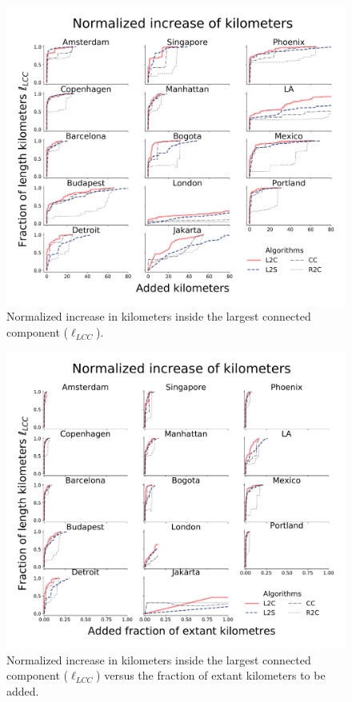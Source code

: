 \begin{figure}[h!]
  \centering
  \includegraphics[width=\textwidth]{images/datadriven/SI_Lengths.png}
  \caption{Normalized increase in kilometers inside the largest connected component ($\ell_{LCC}$).}
  \label{fig:LengthsIncrease}
\end{figure}

\begin{figure}[h!]
  \centering
  \includegraphics[width=\textwidth]{images/datadriven/SI_Lengths_Bike-Streets_FractionKM.pdf}
  \caption{Normalized increase in kilometers inside the largest connected component ($\ell_{LCC}$) versus the fraction of extant kilometers to be added.}
  \label{fig:Lengthsncrease_norm}
\end{figure}

